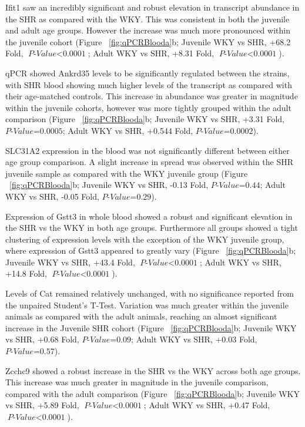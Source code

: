 Ifit1 saw an incredibly significant and robust elevation in transcript abundance in the SHR as compared with the WKY. This was consistent in both the juvenile and adult age groups. However the increase was much more pronounced within the juvenile cohort (Figure ~\ref{fig:qPCRBlooda}b; Juvenile WKY vs SHR, +68.2 Fold, $\textit{P-Value$<$0.0001}$; Adult WKY vs SHR, +8.31 Fold, $\textit{P-Value$<$0.0001}$). 

qPCR showed Ankrd35 levels to be significantly regulated between the strains, with SHR blood showing much higher levels of the transcript as compared with their age-matched controls. This increase in abundance was greater in magnitude within the juvenile cohorts, however was more tightly grouped within the adult comparison (Figure ~\ref{fig:qPCRBlooda}b; Juvenile WKY vs SHR, +3.31 Fold, $\textit{P-Value=0.0005}$; Adult WKY vs SHR, +0.544 Fold, $\textit{P-Value=0.0002}$). 

SLC31A2 expression in the blood was not significantly different between either age group comparison. A slight increase in spread was observed within the SHR juvenile sample as compared with the WKY juvenile group (Figure ~\ref{fig:qPCRBlooda}b; Juvenile WKY vs SHR, -0.13 Fold, $\textit{P-Value=0.44}$; Adult WKY vs SHR, -0.05 Fold, $\textit{P-Value=0.29}$). 

Expression of Gstt3 in whole blood showed a robust and significant elevation in the SHR vs the WKY in both age groups. Furthermore all groups showed a tight clustering of expression levels with the exception of the WKY juvenile group, where expression of Gstt3 appeared to greatly vary (Figure ~\ref{fig:qPCRBlooda}b; Juvenile WKY vs SHR, +43.4 Fold, $\textit{P-Value$<$0.0001}$; Adult WKY vs SHR, +14.8 Fold, $\textit{P-Value$<$0.0001}$).

Levels of Cat remained relatively unchanged, with no significance reported from the unpaired Student's T-Test. Variation was much greater within the juvenile animals as compared with the adult animals, reaching an almost significant increase in the Juvenile SHR cohort (Figure ~\ref{fig:qPCRBlooda}b; Juvenile WKY vs SHR, +0.68 Fold, $\textit{P-Value=0.09}$; Adult WKY vs SHR, +0.03 Fold, $\textit{P-Value=0.57}$). 

Zcchc9 showed a robust increase in the SHR vs the WKY across both age groups. This increase was much greater in magnitude in the juvenile comparison, compared with the adult comparison (Figure ~\ref{fig:qPCRBlooda}b; Juvenile WKY vs SHR, +5.89 Fold, $\textit{P-Value$<$0.0001}$; Adult WKY vs SHR, +0.47 Fold, $\textit{P-Value$<$0.0001}$). \\


